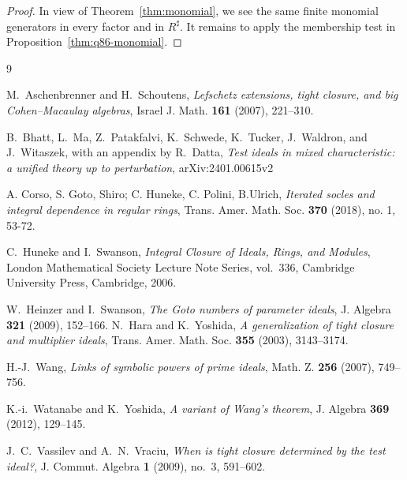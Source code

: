 \documentclass[11pt,a4paper]{amsart}
\numberwithin{equation}{section}
\begin{document}
 \begin{proof}
 In view of 	Theorem~\ref{thm:monomial}, we see the same finite monomial
 	generators in every factor and in $R^\sharp$. It remains to apply the
 	membership test in Proposition~\ref{thm:q86-monomial}.
 \end{proof}
 

 
 
 
 
 
 
 

 

 
\begin{thebibliography}{9}


M.~Aschenbrenner and H.~Schoutens,
\emph{Lefschetz extensions, tight closure, and big
	Cohen--Macaulay algebras},
Israel J. Math. \textbf{161} (2007), 221--310.
 
 B.~Bhatt, L.~Ma, Z.~Patakfalvi, K.~Schwede, K.~Tucker,
 J.~Waldron, and J.~Witaszek, with an appendix by R.~Datta,
 \emph{Test ideals in mixed characteristic: a unified theory up
 	to perturbation}, arXiv:2401.00615v2
 
A. Corso, S. Goto, Shiro; C. Huneke, C. Polini, B.Ulrich,   \emph{Iterated socles and integral dependence in regular rings}, Trans. Amer. Math. Soc. \textbf{370} (2018), no. 1, 53-72.

 
C.~Huneke and I.~Swanson,
\emph{Integral Closure of Ideals, Rings, and Modules},
London Mathematical Society Lecture Note Series, vol.~336,
Cambridge University Press, Cambridge, 2006. 
 
 W.~Heinzer and I.~Swanson,
 \emph{The Goto numbers of parameter ideals},
 J. Algebra \textbf{321} (2009), 152--166.
 N.~Hara and K.~Yoshida,
 \emph{A generalization of tight closure and multiplier ideals},
 Trans. Amer. Math. Soc. \textbf{355} (2003), 3143--3174.
 
H.-J.~Wang,
\emph{Links of symbolic powers of prime ideals},
Math. Z. \textbf{256} (2007), 749--756.
 

K.-i.~Watanabe and K.~Yoshida,
\emph{A variant of Wang's theorem},
J. Algebra \textbf{369} (2012), 129--145.

 
  


J.~C.~Vassilev and A.~N.~Vraciu,
\emph{When is tight closure determined by the test ideal?},
J. Commut. Algebra \textbf{1} (2009), no.~3, 591--602.
 

\end{thebibliography}
\end{document}
